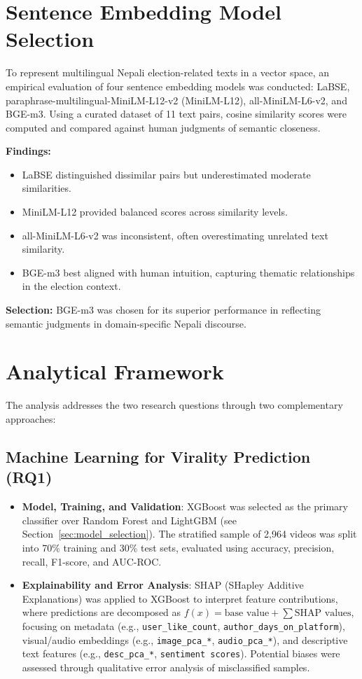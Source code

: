 \documentclass[12pt,a4paper]{report}
\begin{document}
\section{Sentence Embedding Model Selection}
To represent multilingual Nepali election-related texts in a vector space, an empirical evaluation of four sentence embedding models was conducted: LaBSE, paraphrase-multilingual-MiniLM-L12-v2 (MiniLM-L12), all-MiniLM-L6-v2, and BGE-m3. Using a curated dataset of 11 text pairs, cosine similarity scores were computed and compared against human judgments of semantic closeness.

\textbf{Findings:}
\begin{itemize}
    \item LaBSE distinguished dissimilar pairs but underestimated moderate similarities.
    \item MiniLM-L12 provided balanced scores across similarity levels.
    \item all-MiniLM-L6-v2 was inconsistent, often overestimating unrelated text similarity.
    \item BGE-m3 best aligned with human intuition, capturing thematic relationships in the election context.
\end{itemize}

\textbf{Selection:} BGE-m3 was chosen for its superior performance in reflecting semantic judgments in domain-specific Nepali discourse.

\section{Analytical Framework}

The analysis addresses the two research questions through two complementary approaches:

\subsection{Machine Learning for Virality Prediction (RQ1)}
\begin{itemize}
    \item \textbf{Model, Training, and Validation}: XGBoost was selected as the primary classifier over Random Forest and LightGBM (see Section~\ref{sec:model_selection}). The stratified sample of 2,964 videos was split into 70\% training and 30\% test sets, evaluated using accuracy, precision, recall, F1-score, and AUC-ROC.
    
    \item \textbf{Explainability and Error Analysis}: SHAP (SHapley Additive Explanations) was applied to XGBoost to interpret feature contributions, where predictions are decomposed as $f(x) = \text{base value} + \sum \text{SHAP values}$, focusing on metadata (e.g., \texttt{user\_like\_count}, \texttt{author\_days\_on\_platform}), visual/audio embeddings (e.g., \texttt{image\_pca\_*}, \texttt{audio\_pca\_*}), and descriptive text features (e.g., \texttt{desc\_pca\_*}, \texttt{sentiment scores}). Potential biases were assessed through qualitative error analysis of misclassified samples.
\end{itemize}
\end{document}
